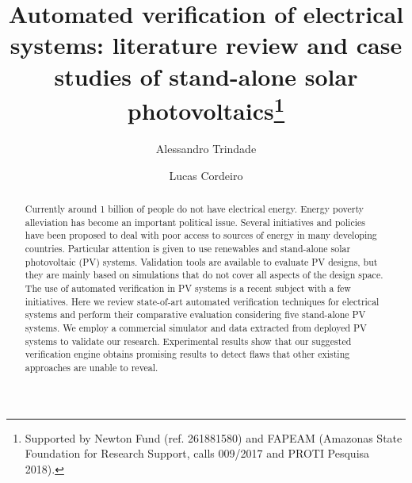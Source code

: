 \documentclass[runningheads]{llncs}
\begin{document}
%
\title{Automated verification of electrical systems: literature review and case studies of stand-alone solar photovoltaics\thanks{Supported by Newton Fund (ref. 261881580) and FAPEAM
(Amazonas State Foundation for Research Support, calls 009/2017 and PROTI Pesquisa 2018).}}
%
%
\author{Alessandro Trindade \and
Lucas Cordeiro}
%
%
%
\maketitle              %
%
\begin{abstract}
Currently around 1 billion of people do not have electrical energy. Energy poverty alleviation has become an important political issue. Several initiatives and policies have been proposed to deal with poor access to sources of energy in many developing countries. Particular attention is given to use renewables and stand-alone solar photovoltaic (PV) systems. Validation tools are available to evaluate PV designs, but they are mainly based on simulations that do not cover all aspects of the design space. The use of automated verification in PV systems is a recent subject with a few initiatives. Here we review state-of-art automated verification techniques for electrical systems and perform their comparative evaluation considering five stand-alone PV systems. We employ a commercial simulator and data extracted from deployed PV systems to validate our research. Experimental results show that our suggested verification engine obtains promising results to detect flaws that other existing approaches are unable to reveal.

\end{abstract}
%
%
%
\end{document}
